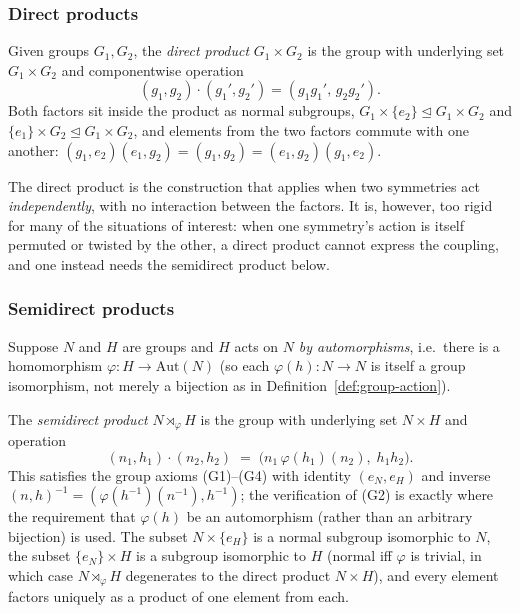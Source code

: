 \documentclass[mathematics,review,submit,moreauthors]{Definitions/mdpi}
\begin{document}
\subsubsection{Direct products}
\label{subsubsec:direct-products}

\begin{Definition}
\label{def:direct-product}
Given groups $G_1, G_2$, the \emph{direct product} $G_1 \times G_2$ is the
group with underlying set $G_1 \times G_2$ and componentwise operation
\[
    (g_1, g_2) \cdot (g_1', g_2') = (g_1 g_1',\, g_2 g_2').
\]
Both factors sit inside the product as normal subgroups,
$G_1 \times \{e_2\} \trianglelefteq G_1 \times G_2$ and
$\{e_1\} \times G_2 \trianglelefteq G_1 \times G_2$, and elements from the
two factors commute with one another: $(g_1,e_2)(e_1,g_2) = (g_1,g_2) =
(e_1,g_2)(g_1,e_2)$.
\end{Definition}

The direct product is the construction that applies when two symmetries act
\emph{independently}, with no interaction between the factors. It is,
however, too rigid for many of the situations of interest: when one
symmetry's action is itself permuted or twisted by the other, a direct
product cannot express the coupling, and one instead needs the semidirect
product below.

\subsubsection{Semidirect products}
\label{subsubsec:semidirect-products}

Suppose $N$ and $H$ are groups and $H$ acts on $N$ \emph{by automorphisms},
i.e.\ there is a homomorphism $\varphi : H \to \mathrm{Aut}(N)$ (so each
$\varphi(h) : N \to N$ is itself a group isomorphism, not merely a bijection
as in Definition~\ref{def:group-action}).

\begin{Definition}
\label{def:semidirect-product}
The \emph{semidirect product} $N \rtimes_\varphi H$ is the group with
underlying set $N \times H$ and operation
\[
    (n_1, h_1) \cdot (n_2, h_2) \;=\; \bigl(n_1 \, \varphi(h_1)(n_2),\; h_1 h_2 \bigr).
\]
This satisfies the group axioms (G1)--(G4) with identity $(e_N, e_H)$ and
inverse $(n,h)^{-1} = (\varphi(h^{-1})(n^{-1}), h^{-1})$; the verification of
(G2) is exactly where the requirement that $\varphi(h)$ be an automorphism
(rather than an arbitrary bijection) is used. The subset
$N \times \{e_H\}$ is a normal subgroup isomorphic to $N$, the subset
$\{e_N\} \times H$ is a subgroup isomorphic to $H$ (normal iff $\varphi$ is
trivial, in which case $N \rtimes_\varphi H$ degenerates to the direct
product $N \times H$), and every element factors uniquely as a product of
one element from each.
\end{Definition}
\end{document}
